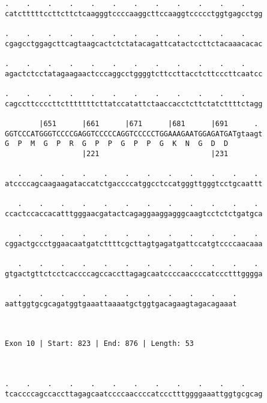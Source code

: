 \documentclass{article}
\begin{document}
\begin{Verbatim}
.    .    .    .    .    .    .    .    .    .    .    .    
catctttttccttcttctcaagggtccccaaggcttccaaggtccccctggtgagcctgg
                                                            
.    .    .    .    .    .    .    .    .    .    .    .    
cgagcctggagcttcagtaagcactctctatacagattcatactccttctacaaacacac
                                                            
.    .    .    .    .    .    .    .    .    .    .    .    
agactctcctatagaagaactcccaggcctggggtcttccttacctcttcccttcaatcc
                                                            
.    .    .    .    .    .    .    .    .    .    .    .    
cagccttccccttctttttttcttatccatattctaaccacctcttctatcttttctagg
                                                            
        |651      |661      |671      |681      |691      . 
GGTCCCATGGGTCCCCGAGGTCCCCCAGGTCCCCCTGGAAAGAATGGAGATGATgtaagt
G  P  M  G  P  R  G  P  P  G  P  P  G  K  N  G  D  D        
                  |221                          |231        
  
   .    .    .    .    .    .    .    .    .    .    .    . 
atccccagcaagaagataccatctgaccccatggcctccatgggttgggtcctgcaattt
                                                            
   .    .    .    .    .    .    .    .    .    .    .    . 
ccactccaccacatttgggaacgatactcagaggaaggagggcaagtcctctctgatgca
                                                            
   .    .    .    .    .    .    .    .    .    .    .    . 
cggactgccctggaacaatgatcttttcgcttagtgagatgattccatgtccccaacaaa
                                                            
   .    .    .    .    .    .    .    .    .    .    .    . 
gtgactgttctcctcaccccagccaccttagagcaatccccaaccccatccctttgggga
                                                            
   .    .    .    .    .    .    .    .    .    .    .
aattggtgcgcagatggtgaaattaaaatgctggtgacagaagtagacagaaat
                                                      
                                                      
 
Exon 10 | Start: 823 | End: 876 | Length: 53



.    .    .    .    .    .    .    .    .    .    .    .    
tcaccccagccaccttagagcaatccccaaccccatccctttggggaaattggtgcgcag
                                                            

\end{Verbatim}
\end{document}
